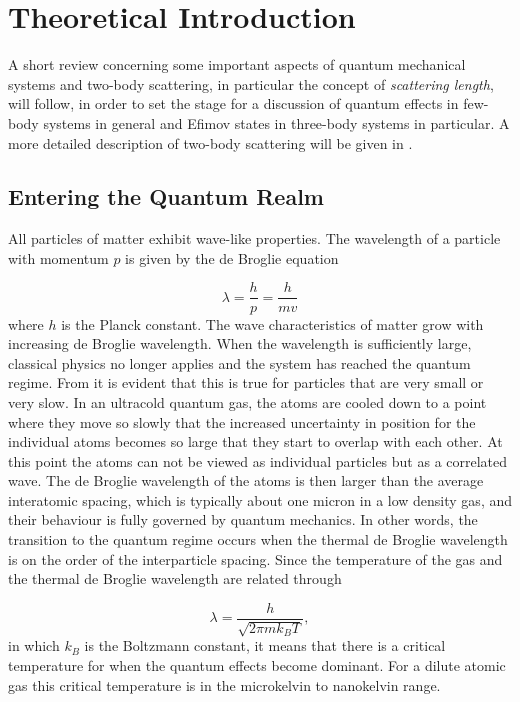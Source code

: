 \section{Theoretical Introduction}
A short review concerning some important aspects of quantum mechanical systems and two-body scattering, in particular the concept of \emph{scattering length}, will follow, in order to set the stage for a discussion of quantum effects in few-body systems in general and Efimov states in three-body systems in particular. A more detailed description of two-body scattering will be given in .

\subsection{Entering the Quantum Realm}
All particles of matter exhibit wave-like properties. The wavelength of a particle with momentum $p$ is given by the de Broglie equation

\begin{equation} \label{eq:1}
\lambda = \frac{h}{p} = \frac{h}{mv}
\end{equation}
where $h$ is the Planck constant. The wave characteristics of matter grow with increasing de Broglie wavelength. When the wavelength is sufficiently large, classical physics no longer applies and the system has reached the quantum regime. From  it is evident that this is true for particles that are very small or very slow. In an ultracold quantum gas, the atoms are cooled down to a point where they move so slowly that the increased uncertainty in position for the individual atoms becomes so large that they start to overlap with each other. At this point the atoms can not be viewed as individual particles but as a correlated wave. The de Broglie wavelength of the atoms is then larger than the average interatomic spacing, which is typically about one micron in a low density gas, and their behaviour is fully governed by quantum mechanics. In other words, the transition to the quantum regime occurs when the thermal de Broglie wavelength is on the order of the interparticle spacing. Since the temperature of the gas and the thermal de Broglie wavelength are related through

\begin{equation}
\lambda = \frac{h}{\sqrt{2\pi m k_B T}},
\end{equation}
in which $k_B$ is the Boltzmann constant, it means that there is a critical temperature for when the quantum effects become dominant. For a dilute atomic gas this critical temperature is in the microkelvin to nanokelvin range.

